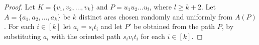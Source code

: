 \documentclass[11pt]{article}
\newcommand{\AYr}[1]{{#1}}
\newcommand{\QGr}[1]{{#1}}
\newcommand{\2}{\vspace{0.2cm}}
\begin{document}
    \begin{proof}
		
        \AYr{  Let $K=\{v_1,v_2,\dots,v_k\}$ and  $P = u_1u_2\ldots u_{l}$, where $l \geq k+2$. Let $A=\{a_1,a_2,\ldots,a_k\}$ be $k$ distinct arcs chosen randomly  and uniformly from $A(P)$. For each $i \in [k]$ let $a_i=s_it_i$ and let $P'$ be obtained from the path $P$,
        by substituting $a_i$ with the oriented path $s_i v_i t_i$ for each $i \in [k]$.
        
}
\end{proof}
\end{document}

